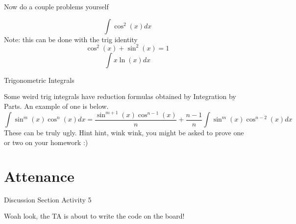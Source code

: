 \documentclass{beamer}
\begin{document}
\begin{frame}{Now do a couple problems yourself}

        \[
            \int \cos^2(x)dx
        \]
        \footnotesize{Note: this can be done with the trig identity}
        \[
            \cos^2(x) + \sin^2(x) = 1
        \]
        \normalsize
    \emp
        \[
            \int x\ln(x)dx
        \]
    \emp

\end{frame}

\begin{frame}{Trigonometric Integrals}

Some weird trig integrals have reduction formulas obtained by Integration by Parts. An example of one is below. 
\scriptsize
    \[
        \int \sin^m(x)\cos^n(x)dx = \frac{\sin^{m+1}(x)\cos^{n-1}(x)}{n} + \frac{n - 1}{n}\int \sin^{m}(x)\cos^{n-2}(x)dx
    \]
These can be truly ugly. Hint hint, wink wink, you might be asked to prove one or two on your homework :)
\normalsize

\end{frame}


\section{Attenance}
\begin{frame}{Discussion Section Activity 5}
    \raggedright
    Woah look, the TA is about to write the code on the board!
\end{frame}
\end{document}

